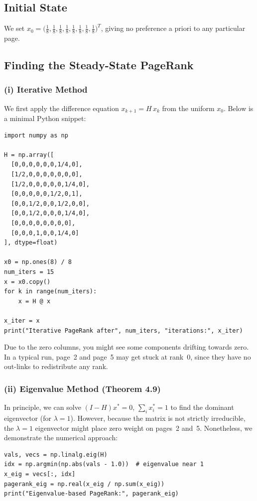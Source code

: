 \documentclass{article}
\begin{document}
\subsection{Initial State}

We set $x_0 = \bigl(\tfrac{1}{8}, \tfrac{1}{8}, \tfrac{1}{8}, \tfrac{1}{8}, \tfrac{1}{8}, \tfrac{1}{8}, \tfrac{1}{8}, \tfrac{1}{8}\bigr)^T$, 
giving no preference a priori to any particular page.

\subsection{Finding the Steady-State PageRank}

\subsubsection{(i) Iterative Method}
We first apply the difference equation $x_{k+1} = H\,x_k$ from the uniform $x_0$. 
Below is a minimal Python snippet:

\begin{verbatim}
import numpy as np

H = np.array([
  [0,0,0,0,0,0,1/4,0],
  [1/2,0,0,0,0,0,0,0],
  [1/2,0,0,0,0,0,1/4,0],
  [0,0,0,0,0,1/2,0,1],
  [0,0,1/2,0,0,1/2,0,0],
  [0,0,1/2,0,0,0,1/4,0],
  [0,0,0,0,0,0,0,0],
  [0,0,0,1,0,0,1/4,0]
], dtype=float)

x0 = np.ones(8) / 8
num_iters = 15
x = x0.copy()
for k in range(num_iters):
    x = H @ x

x_iter = x
print("Iterative PageRank after", num_iters, "iterations:", x_iter)
\end{verbatim}

\noindent
Due to the zero columns, you might see some components drifting towards zero.  
In a typical run, page~2 and page~5 may get stuck at rank~0, since they have no out-links 
to redistribute any rank.

\subsubsection{(ii) Eigenvalue Method (Theorem 4.9)}
In principle, we can solve $(I - H)x^*=0$, $\sum_i x_i^*=1$ to find the dominant 
eigenvector (for $\lambda=1$).  However, because the matrix is not strictly irreducible, 
the $\lambda=1$ eigenvector might place zero weight on pages~2 and~5.  
Nonetheless, we demonstrate the numerical approach:

\begin{verbatim}
vals, vecs = np.linalg.eig(H)
idx = np.argmin(np.abs(vals - 1.0))  # eigenvalue near 1
x_eig = vecs[:, idx]
pagerank_eig = np.real(x_eig / np.sum(x_eig))
print("Eigenvalue-based PageRank:", pagerank_eig)
\end{verbatim}
\end{document}
